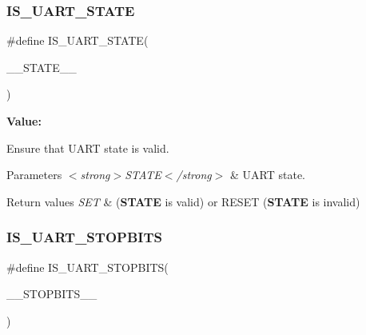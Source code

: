 \subsubsection{\texorpdfstring{IS\_UART\_STATE}{IS\_UART\_STATE}}
{\footnotesize\ttfamily \#define I\+S\+\_\+\+U\+A\+R\+T\+\_\+\+S\+T\+A\+TE(\begin{DoxyParamCaption}\item[{}]{\+\_\+\+\_\+\+S\+T\+A\+T\+E\+\_\+\+\_\+ }\end{DoxyParamCaption})}

{\bfseries Value\+:}
\begin{DoxyCode}{0}

\end{DoxyCode}


Ensure that U\+A\+RT state is valid. 


\begin{DoxyParams}{Parameters}
{\em $<$strong$>$\+S\+T\+A\+T\+E$<$/strong$>$} & U\+A\+RT state. \\
\hline
\end{DoxyParams}

\begin{DoxyRetVals}{Return values}
{\em S\+ET} & ({\bfseries{S\+T\+A\+TE}} is valid) or R\+E\+S\+ET ({\bfseries{S\+T\+A\+TE}} is invalid) \\
\hline
\end{DoxyRetVals}
\mbox{\label{group___u_a_r_t___private___macros_ga0fa4dec621a59f8c07f42548cdbb7f18}} 
\subsubsection{\texorpdfstring{IS\_UART\_STOPBITS}{IS\_UART\_STOPBITS}}
{\footnotesize\ttfamily \#define I\+S\+\_\+\+U\+A\+R\+T\+\_\+\+S\+T\+O\+P\+B\+I\+TS(\begin{DoxyParamCaption}\item[{}]{\+\_\+\+\_\+\+S\+T\+O\+P\+B\+I\+T\+S\+\_\+\+\_\+ }\end{DoxyParamCaption})}

